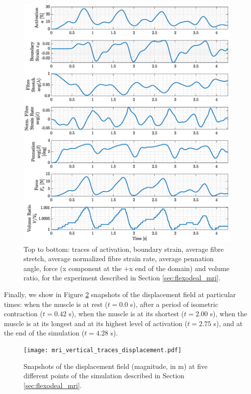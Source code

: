 \documentclass{sfuthesis}
\numberwithin{equation}{section}
\numberwithin{figure}{chapter}
\numberwithin{table}{chapter}
\theoremstyle{definition}
\begin{document}
\begin{figure}
    \centering
    \includegraphics[width=0.99\textwidth]{mri_traces.eps}
    \caption{Top to bottom: traces of activation, boundary strain, average fibre stretch, average normalized fibre strain rate, average pennation angle, force (x component at the +x end of the domain) and volume ratio, for the experiment described in Section \ref{sec:flexodeal_mri}.
    \label{fig:mri_traces}}
\end{figure}

Finally, we show in Figure \ref{fig:mri_displacement_3d} snapshots of the displacement field at particular times: when the muscle is at rest ($t = 0.0$ s), after a period of isometric contraction ($t = 0.42$ s), when the muscle is at its shortest ($t = 2.00$ s), when the muscle is at its longest and at its highest level of activation ($t = 2.75$ s), and at the end of the simulation ($t = 4.28$ s).

\begin{figure}
    \centering
    \texttt{[image: mri\_vertical\_traces\_displacement.pdf]}
    \caption{Snapshots of the displacement field (magnitude, in m) at five different points of the simulation described in Section \ref{sec:flexodeal_mri}.
    \label{fig:mri_displacement_3d}}
\end{figure}
\end{document}
